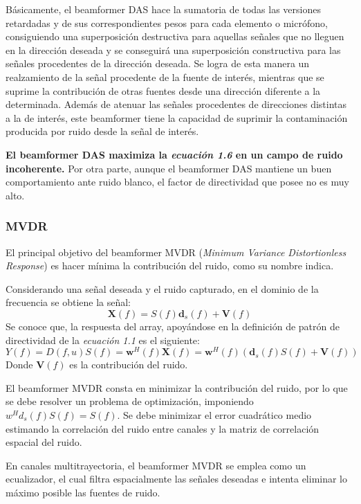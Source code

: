 \documentclass[a4paper,11pt]{book}
\begin{document}
		Básicamente, el beamformer DAS hace la sumatoria de todas las versiones retardadas y de sus correspondientes pesos para cada elemento o micrófono, consiguiendo una superposición destructiva para aquellas señales que no lleguen en la dirección deseada y se conseguirá una superposición constructiva para las señales procedentes de la dirección deseada. Se logra de esta manera un realzamiento de la señal procedente de la fuente de interés, mientras que se suprime la contribución de otras fuentes desde una dirección diferente a la determinada. Además de atenuar las señales procedentes de direcciones distintas a la de interés, este beamformer tiene la capacidad de suprimir la contaminación producida por ruido desde la señal de interés.
		
\textbf{		El beamformer DAS maximiza la \textit{ecuación 1.6} en un campo de ruido incoherente.} Por otra parte, aunque el beamformer DAS mantiene un buen comportamiento ante ruido blanco, el factor de directividad que posee no es muy alto.
		
		\subsubsection{MVDR}
		El principal objetivo del beamformer MVDR (\textit{Minimum Variance Distortionless Response}) es hacer mínima la contribución del ruido, como su nombre indica.
		
		Considerando una señal deseada y el ruido capturado, en el dominio de la frecuencia se obtiene la señal:
		\begin{equation}
		\textbf{X}(f) = S(f)\textbf{d}_{s}(f) + \textbf{V}(f)
		\end{equation}
	Se conoce que, la respuesta del array, apoyándose en la definición de patrón de directividad de la \textit{ecuación 1.1} es el siguiente:
	\begin{equation}
	Y(f) = D(f,u) S(f) = \textbf{w}^{H}(f) \textbf{X}(f) = \textbf{w}^{H}(f)(\textbf{d}_{s}(f) S(f) + \textbf{V}(f))
	\end{equation}
	Donde $\textbf{V}(f)$ es la contribución del ruido.
	
	El beamformer MVDR consta en minimizar la contribución del ruido, por lo que se debe resolver un problema de optimización, imponiendo $w^{H} d_{s}(f) S(f) = S(f)$. Se debe minimizar el error cuadrático medio estimando la correlación del ruido entre canales y la matriz de correlación espacial del ruido.
	
	En canales multitrayectoria, el beamformer MVDR se emplea como un ecualizador, el cual filtra espacialmente las señales deseadas e intenta eliminar lo máximo posible las fuentes de ruido.
	
\end{document}
